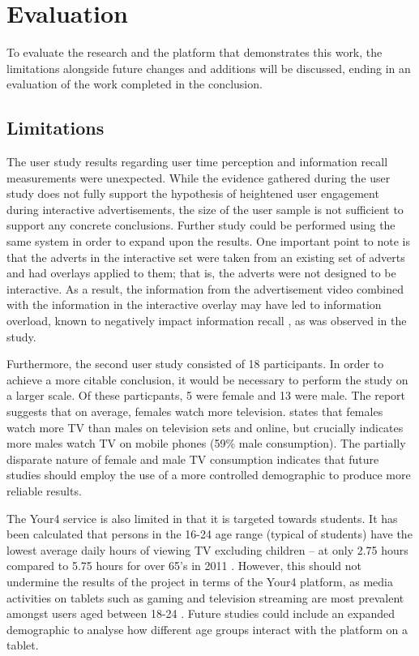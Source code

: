 \section{Evaluation}
	To evaluate the research and the platform that demonstrates this work, the limitations alongside future changes and additions will be discussed, ending in an evaluation of the work completed in the conclusion.
	\subsection{Limitations}

	The user study results regarding user time perception and information recall measurements were unexpected. 
	While the evidence gathered during the user study does not fully support the hypothesis of heightened user engagement during interactive advertisements, the size of the user sample is not sufficient to support any concrete conclusions. Further study could be performed using the same system in order to expand upon the results.
	One important point to note is that the adverts in the interactive set were taken from an existing set of adverts and had overlays applied to them; that is, the adverts were not designed to be interactive. As a result, the information from the advertisement video combined with the information in the interactive overlay may have led to information overload, known to negatively impact information recall \cite{divided_attention}, as was observed in the study.


	Furthermore, the second user study consisted of 18 participants. In order to achieve a more citable conclusion, it would be necessary to perform the study on a larger scale. Of these particpants, 5 were female and 13 were male. The \citet{barb-trends} report suggests that on average, females watch more television. \citet{three-screen} states that females watch more TV than males on television sets and online, but crucially indicates more males watch TV on mobile phones (59\% male consumption). The partially disparate nature of female and male TV consumption indicates that future studies should employ the use of a more controlled demographic to produce more reliable results.

	The Your4 service is also limited in that it is targeted towards students. It has been calculated that persons in the 16-24 age range (typical of students) have the lowest average daily hours of viewing TV excluding children -- at only 2.75 hours compared to 5.75 hours for over 65's in 2011 \citep{barb-trends}. However, this should not undermine the results of the project in terms of the Your4 platform, as media activities on tablets such as gaming and television streaming are most prevalent amongst users aged between 18-24 \citep{viacom}. Future studies could include an expanded demographic to analyse how different age groups interact with the platform on a tablet.

